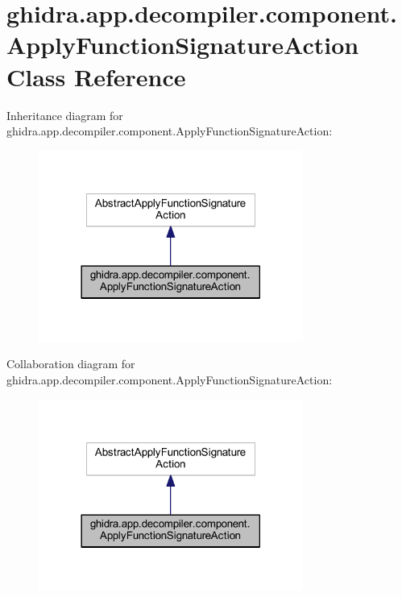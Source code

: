 \hypertarget{classghidra_1_1app_1_1decompiler_1_1component_1_1_apply_function_signature_action}{}\section{ghidra.\+app.\+decompiler.\+component.\+Apply\+Function\+Signature\+Action Class Reference}
\label{classghidra_1_1app_1_1decompiler_1_1component_1_1_apply_function_signature_action}


Inheritance diagram for ghidra.\+app.\+decompiler.\+component.\+Apply\+Function\+Signature\+Action\+:
\nopagebreak
\begin{figure}[H]
\begin{center}
\leavevmode
\includegraphics[width=246pt]{classghidra_1_1app_1_1decompiler_1_1component_1_1_apply_function_signature_action__inherit__graph}
\end{center}
\end{figure}


Collaboration diagram for ghidra.\+app.\+decompiler.\+component.\+Apply\+Function\+Signature\+Action\+:
\nopagebreak
\begin{figure}[H]
\begin{center}
\leavevmode
\includegraphics[width=246pt]{classghidra_1_1app_1_1decompiler_1_1component_1_1_apply_function_signature_action__coll__graph}
\end{center}
\end{figure}
